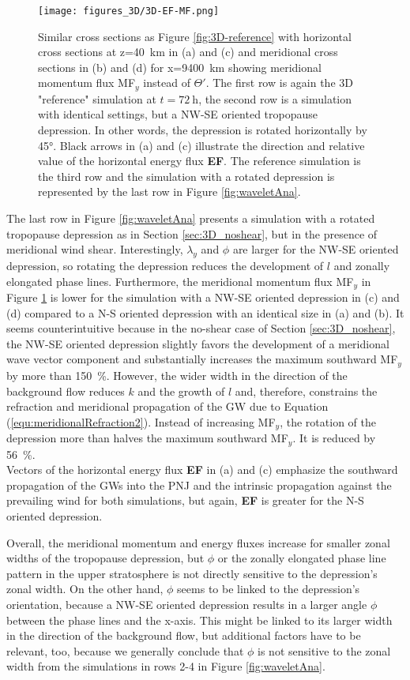 \begin{figure}[t]
    \centering
    \texttt{[image: figures\_3D/3D-EF-MF.png]}
    \caption{Similar cross sections as Figure \ref{fig:3D-reference} with horizontal cross sections at z=\SI{40}{\kilo\meter} in (a) and (c) and meridional cross sections in (b) and (d) for x=\SI{9400}{\kilo\meter} showing meridional momentum flux MF$_y$ instead of $\Theta'$. The first row is again the 3D "reference" simulation at $t=\SI{72}{\hour}$, the second row is a simulation with identical settings, but a NW-SE oriented tropopause depression. In other words, the depression is rotated horizontally by 45°. Black arrows in (a) and (c) illustrate the direction and relative value of the horizontal energy flux \textbf{EF}. The reference simulation is the third row and the simulation with a rotated depression is represented by the last row in Figure \ref{fig:waveletAna}.}
    \label{fig:3D-MFy}
\end{figure}
The last row in Figure \ref{fig:waveletAna} presents a simulation with a rotated tropopause depression as in Section \ref{sec:3D_noshear}, but in the presence of meridional wind shear. Interestingly, $\lambda_y$ and $\phi$ are larger for the NW-SE oriented depression, so rotating the depression reduces the development of $l$ and zonally elongated phase lines. Furthermore, the meridional momentum flux MF$_y$ in Figure \ref{fig:3D-MFy} is lower for the simulation with a NW-SE oriented depression in (c) and (d) compared to a N-S oriented depression with an identical size in (a) and (b). It seems counterintuitive because in the no-shear case of Section \ref{sec:3D_noshear}, the NW-SE oriented depression slightly favors the development of a meridional wave vector component and substantially increases the maximum southward MF$_y$ by more than \SI{150}{\percent}. However, the wider width in the direction of the background flow reduces $k$ and the growth of $l$ and, therefore, constrains the refraction and meridional propagation of the GW due to Equation (\ref{equ:meridionalRefraction2}). Instead of increasing MF$_y$, the rotation of the depression more than halves the maximum southward MF$_y$. It is reduced by \SI{56}{\percent}.\\
Vectors of the horizontal energy flux \textbf{EF} in (a) and (c) emphasize the southward propagation of the GWs into the PNJ and the intrinsic propagation against the prevailing wind for both simulations, but again, \textbf{EF} is greater for the N-S oriented depression.

Overall, the meridional momentum and energy fluxes increase for smaller zonal widths of the tropopause depression, but $\phi$ or the zonally elongated phase line pattern in the upper stratosphere is not directly sensitive to the depression's zonal width. On the other hand, $\phi$ seems to be linked to the depression's orientation, because a NW-SE oriented depression results in a larger angle $\phi$ between the phase lines and the x-axis. This might be linked to its larger width in the direction of the background flow, but additional factors have to be relevant, too, because we generally conclude that $\phi$ is not sensitive to the zonal width from the simulations in rows 2-4 in Figure \ref{fig:waveletAna}.

